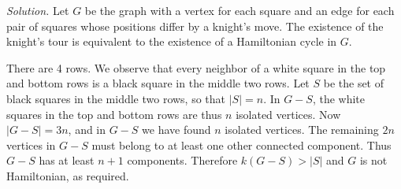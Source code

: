 \documentclass[10pt,reqno]{amsart}
\begin{document}
\begin{outline}[enumerate]
\medskip
\noindent \emph{Solution.} Let $G$ be the graph with a vertex for each square
and an edge for each pair of squares whose positions differ by a knight's move.
The existence of the knight's tour is equivalent to the existence of a
Hamiltonian cycle in $G$.

There are 4 rows. We observe that every neighbor of a white square in the top
and bottom rows is a black square in the middle two rows. Let $S$ be the set of
black squares in the middle two rows, so that $|S| = n$. In $G-S$, the white
squares in the top and bottom rows are thus $n$ isolated vertices. Now $|G-S| =
3n$, and in $G-S$ we have found $n$ isolated vertices. The remaining $2n$
vertices in $G-S$ must belong to at least one other connected component. Thus
$G-S$ has at least $n+1$ components. Therefore $k(G-S) > |S|$ and $G$ is not
Hamiltonian, as required.

\medskip

\end{outline}
\end{document}
